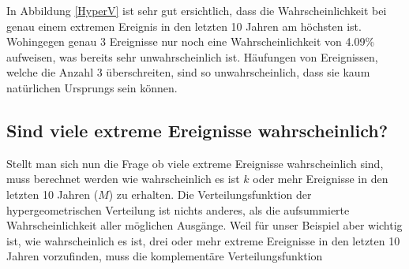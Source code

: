 \begin{refsection}
In Abbildung \ref{HyperV} ist sehr gut ersichtlich, dass die Wahrscheinlichkeit bei genau einem extremen Ereignis in den letzten 10 Jahren am höchsten ist. Wohingegen genau 3 Ereignisse nur noch eine Wahrscheinlichkeit von 4.09\% aufweisen, was bereits sehr unwahrscheinlich ist. Häufungen von Ereignissen, welche die Anzahl 3 überschreiten, sind so unwahrscheinlich, dass sie kaum natürlichen Ursprungs sein können.

\subsection{Sind viele extreme Ereignisse wahrscheinlich?}
Stellt man sich nun die Frage ob viele extreme Ereignisse wahrscheinlich sind, muss berechnet werden wie wahrscheinlich es ist $k$ oder mehr Ereignisse in den letzten 10 Jahren ($M$) zu erhalten. 
Die Verteilungsfunktion der hypergeometrischen Verteilung ist nichts anderes, als die aufsummierte Wahrscheinlichkeit aller möglichen Ausgänge. Weil für unser Beispiel aber wichtig ist, wie wahrscheinlich es ist, drei oder mehr extreme Ereignisse in den letzten 10 Jahren vorzufinden, muss die komplementäre Verteilungsfunktion 


\end{refsection}
